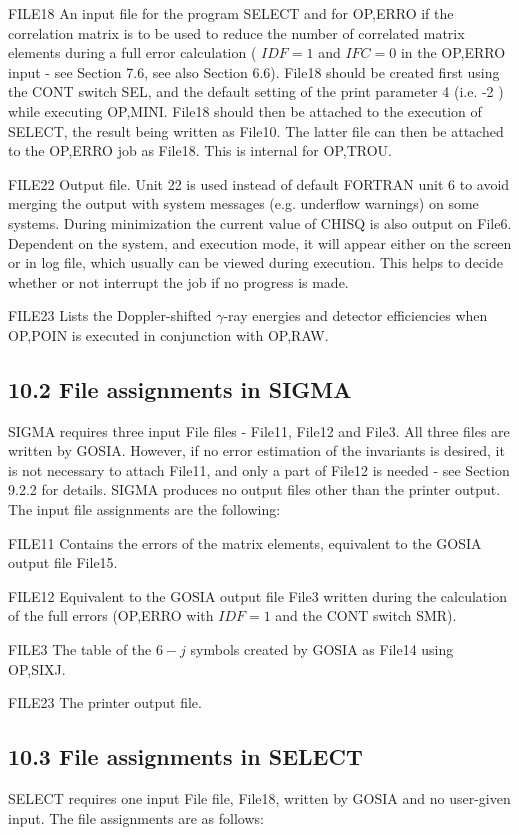 \documentclass[10pt]{article}
\begin{document}
FILE18 An input file for the program SELECT and for OP,ERRO if the correlation matrix is to be used to reduce the number of correlated matrix elements during a full error calculation ( $I D F=1$ and $I F C=0$ in the OP,ERRO input - see Section 7.6, see also Section 6.6). File18 should be created first using the CONT switch SEL, and the default setting of the print parameter 4 (i.e. -2 ) while executing OP,MINI. File18 should then be attached to the execution of SELECT, the result being written as File10. The latter file can then be attached to the OP,ERRO job as File18. This is internal for OP,TROU.

FILE22 Output file. Unit 22 is used instead of default FORTRAN unit 6 to avoid merging the output with system messages (e.g. underflow warnings) on some systems. During minimization the current value of CHISQ is also output on File6. Dependent on the system, and execution mode, it will appear either on the screen or in log file, which usually can be viewed during execution. This helps to decide whether or not interrupt the job if no progress is made.

FILE23 Lists the Doppler-shifted $\gamma$-ray energies and detector efficiencies when OP,POIN is executed in conjunction with OP,RAW.

\subsection*{10.2 File assignments in SIGMA}
SIGMA requires three input File files - File11, File12 and File3. All three files are written by GOSIA. However, if no error estimation of the invariants is desired, it is not necessary to attach File11, and only a part of File12 is needed - see Section 9.2.2 for details. SIGMA produces no output files other than the printer output. The input file assignments are the following:

FILE11 Contains the errors of the matrix elements, equivalent to the GOSIA output file File15.

FILE12 Equivalent to the GOSIA output file File3 written during the calculation of the full errors (OP,ERRO with $I D F=1$ and the CONT switch SMR).

FILE3 The table of the $6-j$ symbols created by GOSIA as File14 using OP,SIXJ.

FILE23 The printer output file.

\subsection*{10.3 File assignments in SELECT}
SELECT requires one input File file, File18, written by GOSIA and no user-given input. The file assignments are as follows:
\end{document}
